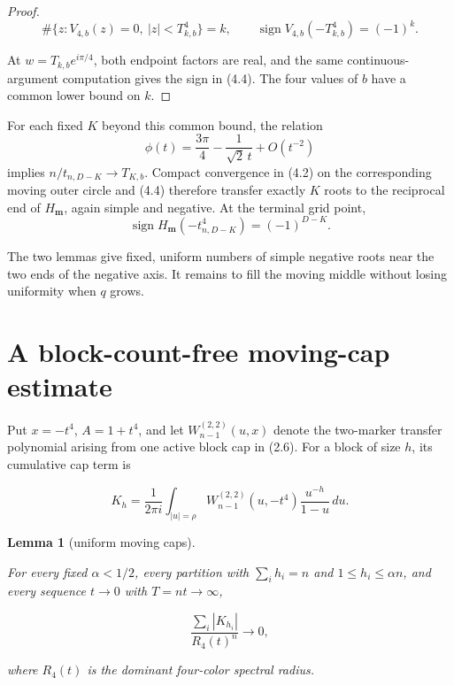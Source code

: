 \documentclass[11pt]{article}
\newtheorem{lemma}[theorem]{Lemma}
\begin{document}
\begin{proof}
\[
\#\{z:V_{4,b}(z)=0,\ |z|<T_{k,b}^4\}=k,\qquad
\operatorname{sign}V_{4,b}(-T_{k,b}^4)=(-1)^k. \tag{4.4}
\]

At $w=T_{k,b}e^{i\pi/4}$, both endpoint factors are real, and the same
continuous-argument computation gives the sign in (4.4).  The four values of
$b$ have a common lower bound on $k$.
\end{proof}


For each fixed $K$ beyond this common bound, the relation
\[
\phi(t)=\frac{3\pi}{4}-\frac1{\sqrt2\,t}+O(t^{-2})
\]
implies $n/t_{n,D-K}\to T_{K,b}$.  Compact convergence in (4.2) on
the corresponding moving outer circle and (4.4) therefore transfer exactly
$K$ roots to the reciprocal end of $H_{\mathbf m}$, again simple and
negative.  At the terminal grid point,
\[
\operatorname{sign}H_{\mathbf m}(-t_{n,D-K}^4)=(-1)^{D-K}. \tag{4.5}
\]

The two lemmas give fixed, uniform numbers of simple negative roots near the two
ends of the negative axis.  It remains to fill the moving middle without losing
uniformity when $q$ grows.

\section{A block-count-free moving-cap estimate}


Put $x=-t^4$, $A=1+t^4$, and let
$W_{n-1}^{(2,2)}(u,x)$ denote the two-marker transfer polynomial arising from
one active block cap in (2.6).  For a block of size $h$, its cumulative cap term
is

\[
K_h=\frac1{2\pi i}\int_{|u|=\rho}
W_{n-1}^{(2,2)}(u,-t^4)\frac{u^{-h}}{1-u}\,du. \tag{5.1}
\]

\Needspace{0.16\textheight}
\begin{lemma}[uniform moving caps]
\label{lemma:5-1}

For every fixed $\alpha<1/2$, every partition with
$\sum_i h_i=n$ and $1\le h_i\le\alpha n$, and every sequence
$t\to0$ with $T=nt\to\infty$,

\[
\frac{\sum_i|K_{h_i}|}{R_4(t)^n}\longrightarrow0, \tag{5.2}
\]

where $R_4(t)$ is the dominant four-color spectral radius.

\end{lemma}
\end{document}
